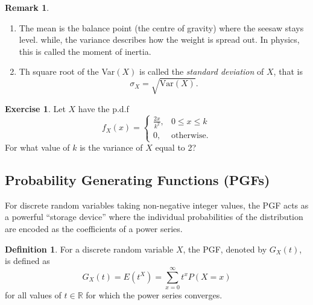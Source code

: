 \documentclass[12pt,a4paper]{report}
\theoremstyle{definition}
\newtheorem{definition}[thm]{Definition}
\newtheorem{exe}[thm]{Exercise}
\newtheorem{remark}[thm]{Remark}
\theoremstyle{plain}
\theoremstyle{definition}
\begin{document}
\begin{remark}
\begin{enumerate}
\item The mean is the balance point (the centre of gravity) where the seesaw stays level. while, the variance describes how the weight is spread out. In physics, this is called the moment of inertia.
\item Th square root of the Var$(X)$ is called the \textit{standard deviation} of $X$, that is \[\sigma_X = \sqrt{\text{Var}(X)}.\]
\end{enumerate}
\end{remark}




\begin{exe}
Let $X$ have the p.d.f \[f_X(x) = \begin{cases}
\frac{2x}{k^2}, & 0\leq x \leq k\\
0, & \text{otherwise}.
\end{cases}\] For what value of $k$ is the variance of $X$ equal to 2?
\end{exe}



\subsection{Probability Generating Functions (PGFs)}
For discrete random variables taking non-negative integer values, the PGF acts as a powerful ``storage device'' where the individual probabilities of the distribution are encoded as the coefficients of a power series.

\begin{definition}
For a discrete random variable $X$, the PGF, denoted by $G_X(t)$, is defined as \[G_X(t) = E(t^X) = \sum_{x=0}^{\infty} t^x P(X=x)\] for all values of $t \in \mathbb{R}$ for which the power series converges.
\end{definition}
\end{document}
